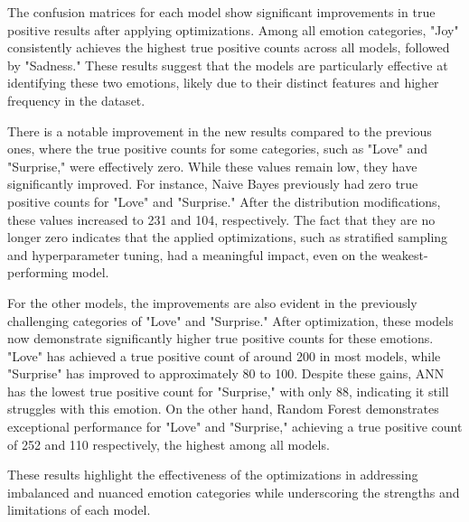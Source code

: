The confusion matrices for each model show significant improvements in true positive results after applying optimizations. Among all emotion categories, "Joy" consistently achieves the highest true positive counts across all models, followed by "Sadness." These results suggest that the models are particularly effective at identifying these two emotions, likely due to their distinct features and higher frequency in the dataset.

There is a notable improvement in the new results compared to the previous ones, where the true positive counts for some categories, such as "Love" and "Surprise," were effectively zero. While these values remain low, they have significantly improved. For instance, Naive Bayes previously had zero true positive counts for "Love" and "Surprise." After the distribution modifications, these values increased to 231 and 104, respectively. The fact that they are no longer zero indicates that the applied optimizations, such as stratified sampling and hyperparameter tuning, had a meaningful impact, even on the weakest-performing model.

For the other models, the improvements are also evident in the previously challenging categories of "Love" and "Surprise." After optimization, these models now demonstrate significantly higher true positive counts for these emotions. "Love" has achieved a true positive count of around 200 in most models, while "Surprise" has improved to approximately 80 to 100. Despite these gains, ANN has the lowest true positive count for "Surprise," with only 88, indicating it still struggles with this emotion. On the other hand, Random Forest demonstrates exceptional performance for "Love" and "Surprise," achieving a true positive count of 252 and 110 respectively, the highest among all models.

These results highlight the effectiveness of the optimizations in addressing imbalanced and nuanced emotion categories while underscoring the strengths and limitations of each model.

\clearpage



